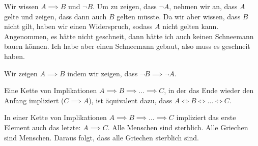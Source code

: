 \documentclass[../../main.tex]{subfiles}
\begin{document}
        {Wir wissen $A \implies B$ und $\lnot B$. Um zu zeigen, dass $\lnot A$, nehmen wir an, dass $A$ gelte und zeigen, dass dann auch $B$ gelten müsste. Da wir aber wissen, dass $B$ nicht gilt, haben wir einen Widerspruch, sodass $A$ nicht gelten kann.}
        {Angenommen, es hätte nicht geschneit, dann hätte ich auch keinen Schneemann bauen können. Ich habe aber einen Schneemann gebaut, also muss es geschneit haben.}
        
        {Wir zeigen $A \implies B$ indem wir zeigen, dass $\lnot B \implies \lnot A$.}
        {}
    
        {Eine Kette von Implikationen $A \implies B \implies \dots \implies C$, in der das Ende wieder den Anfang impliziert ($C \implies A$), ist äquivalent dazu, dass $A \iff B \iff \dots \iff C$.}
        {}
    
        {In einer Kette von Implikationen $A \implies B \implies \dots \implies C$ impliziert das erste Element auch das letzte: $A \implies C$.}
        {%
        Alle Menschen sind sterblich. Alle Griechen sind Menschen. Daraus folgt, dass alle Griechen sterblich sind.}
\end{document}
